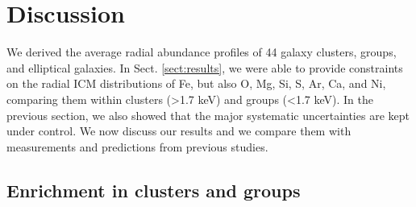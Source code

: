 \documentclass{aa}
\begin{document}

\section{Discussion}\label{sect:discussion}


We derived the average radial abundance profiles of 44 galaxy clusters, groups, and elliptical galaxies. In Sect. \ref{sect:results}, we were able to provide constraints on the radial ICM distributions of Fe, but also O, Mg, Si, S, Ar, Ca, and Ni, comparing them within clusters (>1.7 keV) and groups (<1.7 keV). In the previous section, we also showed that the major systematic uncertainties are kept under control. We now discuss our results and we compare them with measurements and predictions from previous studies.



\subsection{Enrichment in clusters and groups}\label{sect:discussion_clgr}
\end{document}
